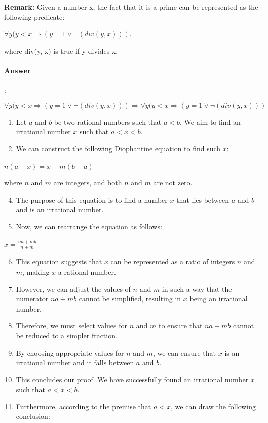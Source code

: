 \documentclass{article}
\begin{document}
\begin{tcolorbox}
  \textbf{Remark:} Given a number x, the fact that it is a prime can be represented as the following predicate:
  
  $ \forall y(y < x \Rightarrow (y = 1 \lor \lnot(  div(y, x) ) ) $.
  
  where div(y, x) is true if y divides x.
\end{tcolorbox}


\paragraph{Answer}:


\begin{equation*}
  \forall y(y < x \Rightarrow (y = 1 \lor \lnot(  div(y, x) ) ) \Rightarrow \forall y(y < x \Rightarrow (y = 1 \lor \lnot(  div(y, x) ) ) 
\end{equation*}

\begin{enumerate}
  \item Let $a$ and $b$ be two rational numbers such that $a < b$. We aim to find an irrational number $x$ such that $a < x < b$.
  \item We can construct the following Diophantine equation to find such $x$:
\end{enumerate}

$ n(a - x) = x - m(b - a) $

where $n$ and $m$ are integers, and both $n$ and $m$ are not zero.

\begin{enumerate}
  \setcounter{enumi}{3}
  \item The purpose of this equation is to find a number $x$ that lies between $a$ and $b$ and is an irrational number.
  \item Now, we can rearrange the equation as follows:
\end{enumerate}

$  x = \frac{na + mb}{n + m} $

\begin{enumerate}
  \setcounter{enumi}{5}
  \item This equation suggests that $x$ can be represented as a ratio of integers $n$ and $m$, making $x$ a rational number.
  \item However, we can adjust the values of $n$ and $m$ in such a way that the numerator $na + mb$ cannot be simplified, resulting in $x$ being an irrational number.
  \item Therefore, we must select values for $n$ and $m$ to ensure that $na + mb$ cannot be reduced to a simpler fraction.
  \item By choosing appropriate values for $n$ and $m$, we can ensure that $x$ is an irrational number and it falls between $a$ and $b$.
  \item This concludes our proof. We have successfully found an irrational number $x$ such that $a < x < b$.
  \item Furthermore, according to the premise that $a < x$, we can draw the following conclusion:
\end{enumerate}
\end{document}
